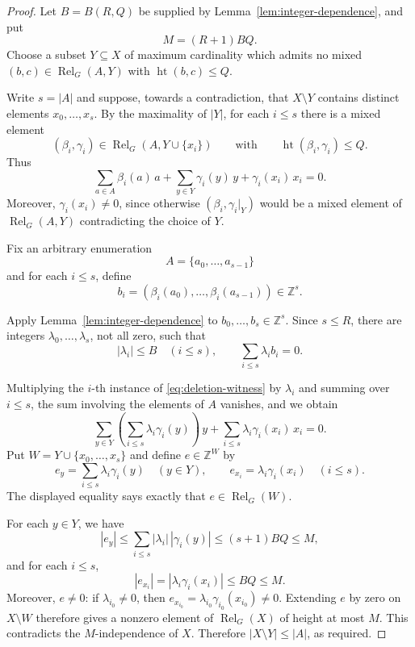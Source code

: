 \documentclass[10pt,a4paper]{amsart}
\newcommand{\Z}{\mathbb Z}
\newcommand{\Rel}{\operatorname{Rel}}
\newcommand{\htop}{\operatorname{ht}}
\begin{document}
\begin{proof}
Let $B=B(R,Q)$ be supplied by
Lemma~\ref{lem:integer-dependence}, and put
\[
M=(R+1)BQ.
\]
Choose a subset $Y\subseteq X$ of maximum cardinality which admits no
mixed $(b,c)\in\Rel_G(A,Y)$ with $\htop(b,c)\le Q$.

Write $s=|A|$ and suppose, towards a contradiction, that
$X\setminus Y$ contains distinct elements $x_0,\ldots,x_s$. By the
maximality of
$|Y|$, for each $i\leq s$ there is a mixed element
\[
 (\beta_i,\gamma_i)\in\Rel_G(A,Y\cup\{x_i\})
 \qquad\text{with}\qquad
 \htop(\beta_i,\gamma_i)\leq Q.
\]
Thus
\begin{equation}\label{eq:deletion-witness}
 \sum_{a\in A}\beta_i(a)\,a
 +
 \sum_{y\in Y}\gamma_i(y)\,y
 +
 \gamma_i(x_i)\,x_i
 =0.
\end{equation}
Moreover, $\gamma_i(x_i)\ne0$, since otherwise
$(\beta_i,\gamma_i|_Y)$ would be a mixed element of $\Rel_G(A,Y)$
contradicting the choice of $Y$.

Fix an arbitrary enumeration
\[
A=\{a_0,\ldots,a_{s-1}\}
\]
and for each $i\le s$, define
\[
b_i=(\beta_i(a_0),\ldots,\beta_i(a_{s-1}))\in\Z^s.
\] 

Apply Lemma~\ref{lem:integer-dependence} to
$b_0,\ldots,b_s\in\Z^s$.  Since $s\le R$, there are integers
$\lambda_0,\ldots,\lambda_s$, not all zero, such that
\[
|\lambda_i|\le B\quad(i\le s),
\qquad
\sum_{i\le s}\lambda_i b_i=0.
\]

Multiplying the $i$-th instance of \eqref{eq:deletion-witness} by $\lambda_i$
and summing over $i\leq s$, the sum involving the elements of $A$ vanishes,
and we obtain
\[
\sum_{y\in Y}
 \left(\sum_{i\le s}\lambda_i\gamma_i(y)\right)\,y
+
\sum_{i\le s}\lambda_i\gamma_i(x_i)\,x_i
=0.
\]
Put $W=Y\cup\{x_0,\ldots,x_s\}$ and define $e\in\Z^W$ by
\[
 e_y=\sum_{i\leq s}\lambda_i\gamma_i(y)\quad(y\in Y),
 \qquad
 e_{x_i}=\lambda_i\gamma_i(x_i)\quad(i\leq s).
\]
The displayed equality says exactly that $e\in\Rel_G(W)$.

For each $y\in Y$, we have
\[
|e_y|\leq\sum_{i\le s}|\lambda_i|\,|\gamma_i(y)|
\le(s+1)BQ\le M,
\]
and for each $i\leq s$,
\[
|e_{x_i}|=|\lambda_i\gamma_i(x_i)|\le BQ\le M.
\]
Moreover, $e\neq0$: if $\lambda_{i_0}\ne0$, then
$e_{x_{i_0}}=\lambda_{i_0}\gamma_{i_0}(x_{i_0})\ne0$.
Extending $e$ by zero on $X\setminus W$ therefore gives a nonzero element
of $\Rel_G(X)$ of height at most $M$.
This contradicts the $M$-independence of $X$.
Therefore
$|X\setminus Y|\le|A|$, as required.
\end{proof}
\end{document}
